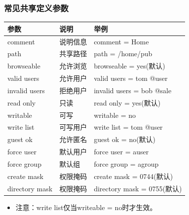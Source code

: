 \documentclass[xcolor=svgnames,presentation]{beamer}
\begin{document}
\begin{frame}
\frametitle{常见共享定义参数}
\label{sec-2-11}


\begin{center}
\begin{tabular}{lll}
 参数            &  说明      &  举例                         \\
\hline
 comment         &  说明信息  &  comment = Home               \\
 path            &  共享路径  &  path = /home/pub             \\
 browseable      &  允许浏览  &  browseable = yes(默认)       \\
 valid users     &  允许用户  &  valid users = tom @user      \\
 invalid users   &  拒绝用户  &  invalid users = bob @sale    \\
 read only       &  只读      &  read only = yes(默认)        \\
 writable        &  可写      &  writable = no                \\
 write list      &  可写用户  &  write list = tom @user       \\
 guest ok        &  允许匿名  &  guest ok = no(默认)          \\
 force user      &  默认用户  &  force user = auser           \\
 force group     &  默认组    &  force group = agroup         \\
 create mask     &  权限掩码  &  create mask = 0744(默认)     \\
 directory mask  &  权限掩码  &  directory mask = 0755(默认)  \\
\end{tabular}
\end{center}
\begin{itemize}

\item 注意：write list仅当writeable = no时才生效。
\label{sec-2-11-1}%
\end{itemize} %
\end{frame}
\end{document}
